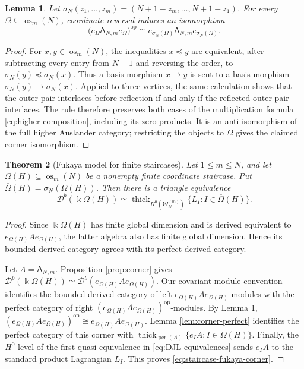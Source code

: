 \documentclass[12pt,a4paper,english,reqno]{amsart}
\theoremstyle{plain}
\newtheorem{theorem}{Theorem}[section]
\newtheorem{lemma}[theorem]{Lemma}
\theoremstyle{definition}
\newcommand{\kk}{\Bbbk}
\newcommand{\perf}{\operatorname{per}}
\newcommand{\thick}{\operatorname{thick}}
\newcommand{\op}{\mathrm{op}}
\newcommand{\os}{\operatorname{os}}
\newcommand{\Wcat}{\mathcal W}
\newcommand{\Db}[1]{{\mathscr D}^b(#1)}
\begin{document}
\begin{lemma}
\label{lem:reflected-corner}
Let $\sigma_N(z_1,\ldots,z_m)
 =(N+1-z_m,\ldots,N+1-z_1)$.
For every $\Omega\subseteq\os_m(N)$, coordinate reversal induces an isomorphism
\[
 \bigl(e_\Omega\mathsf A_{N,m}e_\Omega\bigr)^{\op}
 \cong
 e_{\sigma_N(\Omega)}\mathsf A_{N,m}
 e_{\sigma_N(\Omega)}.
\]
\end{lemma}

\begin{proof}
For $x,y\in\os_m(N)$, the inequalities $x\preceq y$ are equivalent,
after subtracting every entry from $N+1$ and reversing the order, to
$\sigma_N(y)\preceq\sigma_N(x)$.  Thus a basis morphism $x\to y$
is sent to a basis morphism
$\sigma_N(y)\to\sigma_N(x)$.  Applied to three vertices, the same
calculation shows that the outer pair interlaces before reflection if and
only if the reflected outer pair interlaces.  The rule therefore preserves
both cases of the multiplication formula
\eqref{eq:higher-composition}, including its zero products.  It is an
anti-isomorphism of the full higher Auslander category; restricting the
objects to $\Omega$ gives the claimed corner isomorphism.
\end{proof}

\begin{theorem}[Fukaya model for finite staircases]
\label{thm:staircase-fukaya-corner}
Let $1\leq m\leq N$, and let
$\Omega(H)\subseteq\os_m(N)$ be a nonempty finite coordinate staircase.
Put $\overline\Omega(H)=\sigma_N(\Omega(H))$.
Then there is a triangle equivalence
\begin{equation}
 \Db{\kk\Omega(H)}\simeq\thick_{H^0(\Wcat_N^{(m)})}
 \{L_I:I\in\overline\Omega(H)\}.
\label{eq:staircase-fukaya-corner}
\end{equation}
\end{theorem}

\begin{proof}

Since $\kk\Omega(H)$ has finite global dimension and is derived equivalent
to $e_{\Omega(H)}Ae_{\Omega(H)}$, the latter algebra also has finite global
dimension. Hence its bounded derived category agrees with its perfect
derived category.

Let $A=\mathsf A_{N,m}$.  Proposition \ref{prop:corner} gives $\Db{\kk\Omega(H)}
 \simeq\Db{e_{\Omega(H)}Ae_{\Omega(H)}}$.
Our covariant-module convention identifies the bounded derived category of
left $e_{\Omega(H)}Ae_{\Omega(H)}$-modules with the perfect category of
right $(e_{\Omega(H)}Ae_{\Omega(H)})^{\op}$-modules.  By Lemma
\ref{lem:reflected-corner}, $(e_{\Omega(H)}Ae_{\Omega(H)})^{\op}
 \cong
 e_{\overline\Omega(H)}Ae_{\overline\Omega(H)}$.
Lemma \ref{lem:corner-perfect} identifies the perfect category of this
corner with $\thick_{\perf(A)}
 \{e_IA:I\in\overline\Omega(H)\}$.
Finally, the $H^0$-level of the first quasi-equivalence in
\eqref{eq:DJL-equivalences} sends $e_IA$ to the standard product
Lagrangian $L_I$.  This proves \eqref{eq:staircase-fukaya-corner}.
\end{proof}
\end{document}
